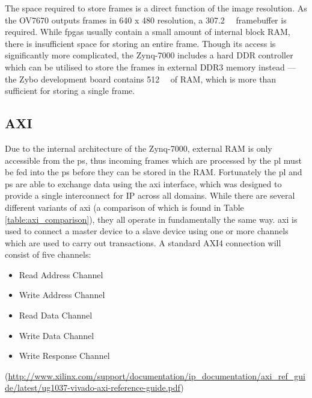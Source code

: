 The space required to store frames is a direct function of the image resolution. As the OV7670 outputs frames in 640 x 480 resolution, a \SI{307.2}{\kilo\byte} framebuffer is required. While \glspl{fpga} usually contain a small amount of internal block RAM, there is insufficient space for storing an entire frame. Though its access is significantly more complicated, the Zynq-7000 includes a hard DDR controller which can be utilised to store the frames in external DDR3 memory instead --- the Zybo development board contains \SI{512}{\mega\byte} of RAM, which is more than sufficient for storing a single frame.


\subsection{AXI}
Due to the internal architecture of the Zynq-7000, external RAM is only accessible from the \gls{ps}, thus incoming frames which are processed by the \gls{pl} must be fed into the \gls{ps} before they can be stored in the RAM. Fortunately the \gls{pl} and \gls{ps} are able to exchange data using the \gls{axi} interface, which was designed to provide a single interconnect for IP across all domains. While there are several different variants of \gls{axi} (a comparison of which is found in Table \ref{table:axi_comparison}), they all operate in fundamentally the same way. \gls{axi} is used to connect a master device to a slave device using one or more channels which are used to carry out transactions. A standard AXI4 connection will consist of five channels:
\begin{itemize}
  \item Read Address Channel
  \item Write Address Channel
  \item Read Data Channel
  \item Write Data Channel
  \item Write Response Channel
\end{itemize}
(\url{http://www.xilinx.com/support/documentation/ip_documentation/axi_ref_guide/latest/ug1037-vivado-axi-reference-guide.pdf})

